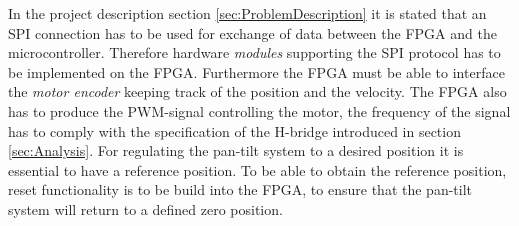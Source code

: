 \documentclass[../../main.tex]{subfiles}
\begin{document}
In the project description section \ref{sec:ProblemDescription} it is stated that an SPI connection has to be used for exchange of data between the FPGA and the microcontroller. Therefore hardware \textit{modules} supporting the SPI protocol has to be implemented on the FPGA. Furthermore the FPGA must be able to interface the \textit{motor encoder} keeping track of the position and the velocity. The FPGA also has to produce the PWM-signal controlling the motor, the frequency of the signal has to comply with the specification of the H-bridge introduced in section \ref{sec:Analysis}. For regulating the pan-tilt system to a desired position it is essential to have a reference position. To be able to obtain the reference position, reset functionality is to be build into the FPGA, to ensure that the pan-tilt system will return to a defined zero position. 





\end{document}
